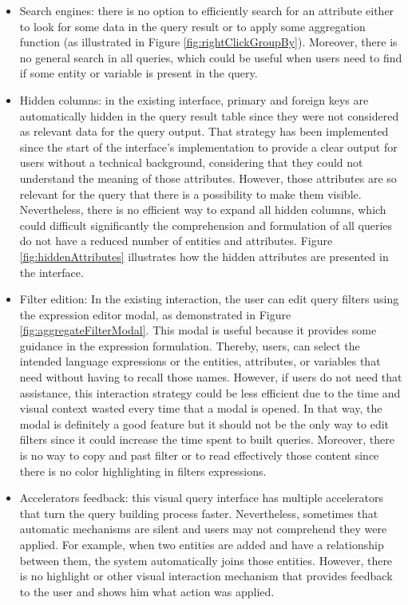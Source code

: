 \begin{itemize}
    \item Search engines: there is no option to efficiently search for an attribute either to look for some data in the query result or to apply some aggregation function (as illustrated in Figure \ref{fig:rightClickGroupBy}). Moreover, there is no general search in all queries, which could be useful when users need to find if some entity or variable is present in the query.
    \item Hidden columns: in the existing interface, primary and foreign keys are automatically hidden in the query result table since they were not considered as relevant data for the query output. That strategy has been implemented since the start of the interface's implementation to provide a clear output for users without a technical background, considering that they could not understand the meaning of those attributes. However, those attributes are so relevant for the query that there is a possibility to make them visible. Nevertheless, there is no efficient way to expand all hidden columns, which could difficult significantly the comprehension and formulation of all queries do not have a reduced number of entities and attributes. Figure \ref{fig:hiddenAttributes} illustrates how the hidden attributes are presented in the interface.
    \item Filter edition: In the existing interaction, the user can edit query filters using the expression editor modal, as demonstrated in Figure \ref{fig:aggregateFilterModal}. This modal is useful because it provides some guidance in the expression formulation. Thereby, users, can select the intended language expressions or the entities, attributes, or variables that need without having to recall those names. However, if users do not need that assistance, this interaction strategy could be less efficient due to the time and visual context wasted every time that a modal is opened. In that way, the modal is definitely a good feature but it should not be the only way to edit filters since it could increase the time spent to built queries. Moreover, there is no way to copy and past filter or to read effectively those content since there is no color highlighting in filters expressions.
    \item Accelerators feedback: this visual query interface has multiple accelerators that turn the query building process faster. Nevertheless, sometimes that automatic mechanisms are silent and users may not comprehend they were applied. For example, when two entities are added and have a relationship between them, the system automatically joins those entities. However, there is no highlight or other visual interaction mechanism that provides feedback to the user and shows him what action was applied.

\end{itemize}
